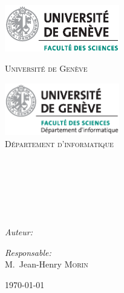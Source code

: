 
\begin{titlepage}

\begin{center}

\begin{minipage}[t]{0.5\textwidth}
  \begin{flushleft}
    \includegraphics [width=5cm]{images/fac_sciences_pant.eps} \\[1cm]
    \begin{spacing}{1.5}
      \textsc{\LARGE Université de Genève}
    \end{spacing}
  \end{flushleft}
\end{minipage}
\begin{minipage}[t]{0.48\textwidth}
  \begin{flushright}
    \includegraphics [width=5cm]{images/dinfo_pant.eps} \\[1.3cm]
    \textsc{\LARGE Département d'informatique}
  \end{flushright}
\end{minipage} \\[1.5cm]

\textsc{\Large \reportsubject}\\[0.5cm]
\HRule \\[0.4cm]
{\huge \bfseries \reporttitle}\\[0.4cm]
\HRule \\[1.5cm]

\begin{minipage}[t]{0.6\textwidth}
  \begin{flushleft} \large
    \emph{Auteur:}\\
    \reportauthor
  \end{flushleft}
\end{minipage}
\begin{minipage}[t]{0.35\textwidth}
  \begin{flushright} \large
    \emph{Responsable:} \\
    M.~Jean-Henry \textsc{Morin} \\ %
  \end{flushright}
\end{minipage}

\vfill

{ \today}%

\end{center}

\end{titlepage}
